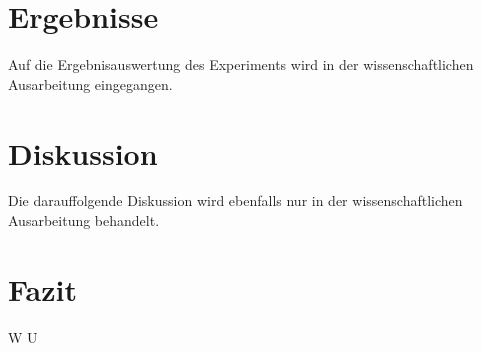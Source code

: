\documentclass{Bericht}
\begin{document}
\section{Ergebnisse}
Auf die Ergebnisauswertung des Experiments wird in der wissenschaftlichen Ausarbeitung eingegangen.
\section{Diskussion}
Die darauffolgende Diskussion wird ebenfalls nur in der wissenschaftlichen Ausarbeitung behandelt.


\section{Fazit} %
W%
U%

\end{document}
